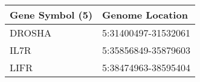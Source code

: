 \begin{tabular}{ll}
\toprule
Gene Symbol (5) &     Genome Location \\
\midrule
         DROSHA & 5:31400497-31532061 \\
           IL7R & 5:35856849-35879603 \\
           LIFR & 5:38474963-38595404 \\
\bottomrule
\end{tabular}
